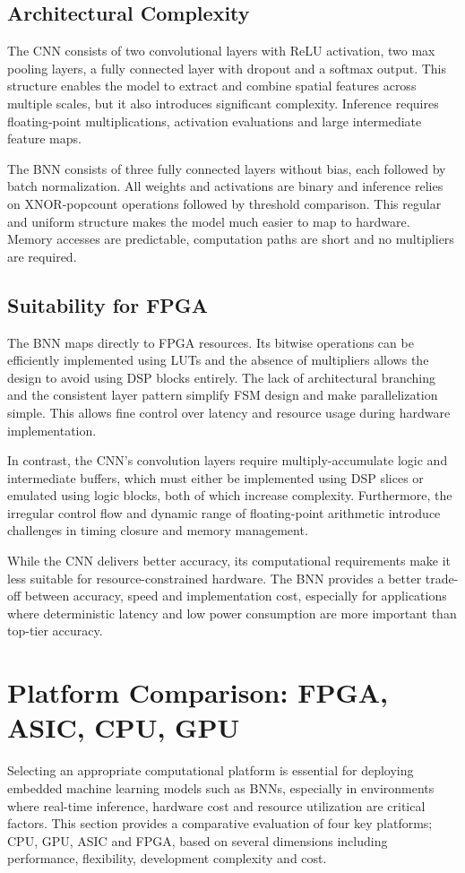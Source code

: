 \documentclass[a4paper,12pt]{report}
\begin{document}
\subsection{Architectural Complexity}
The CNN consists of two convolutional layers with ReLU activation, two max pooling layers, a fully connected layer with dropout and a softmax output. This structure enables the model to extract and combine spatial features across multiple scales, but it also introduces significant complexity. Inference requires floating-point multiplications, activation evaluations and large intermediate feature maps.

The BNN consists of three fully connected layers without bias, each followed by batch normalization. All weights and activations are binary and inference relies on XNOR-popcount operations followed by threshold comparison. This regular and uniform structure makes the model much easier to map to hardware. Memory accesses are predictable, computation paths are short and no multipliers are required.

\subsection{Suitability for FPGA}
The BNN maps directly to FPGA resources. Its bitwise operations can be efficiently implemented using LUTs and the absence of multipliers allows the design to avoid using DSP blocks entirely. The lack of architectural branching and the consistent layer pattern simplify FSM design and make parallelization simple. This allows fine control over latency and resource usage during hardware implementation.

In contrast, the CNN’s convolution layers require multiply-accumulate logic and intermediate buffers, which must either be implemented using DSP slices or emulated using logic blocks, both of which increase complexity. Furthermore, the irregular control flow and dynamic range of floating-point arithmetic introduce challenges in timing closure and memory management.

While the CNN delivers better accuracy, its computational requirements make it less suitable for resource-constrained hardware. The BNN provides a better trade-off between accuracy, speed and implementation cost, especially for applications where deterministic latency and low power consumption are more important than top-tier accuracy.

\clearpage
\section{Platform Comparison: FPGA, ASIC, CPU, GPU}
Selecting an appropriate computational platform is essential for deploying embedded machine learning models such as BNNs, especially in environments where real-time inference, hardware cost and resource utilization are critical factors. This section provides a comparative evaluation of four key platforms; CPU, GPU, ASIC and FPGA, based on several dimensions including performance, flexibility, development complexity and cost. 
\end{document}
